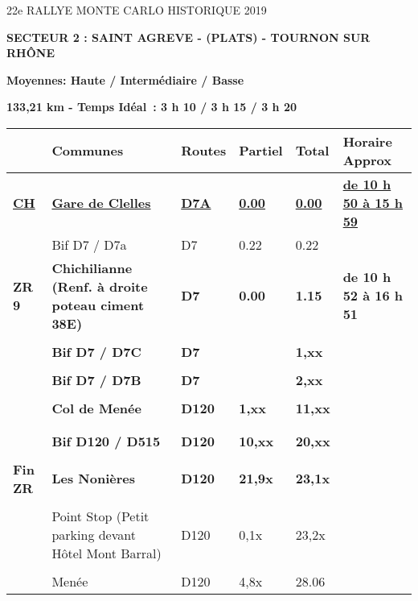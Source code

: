 \documentclass{article}%
\begin{document}
%
\normalsize%
\begin{center} \LARGE{22e RALLYE MONTE CARLO HISTORIQUE 2019} \end{center}%
\begin{flushleft} \textbf{SECTEUR 2 : SAINT AGREVE - (PLATS) - TOURNON SUR RHÔNE
} \end{flushleft}%
\begin{flushright} \textbf{             Moyennes: Haute / Intermédiaire / Basse
} \end{flushright}%
\begin{flushright} \textbf{133,21 km - Temps Idéal : 3 h 10 / 3 h 15 / 3 h 20
} \end{flushright}%
\begin{longtable}{p{2.25cm}|p{6.7cm}|p{2.0cm}|p{1.5cm}|p{1.5cm}|p{3.5cm}}%
\hline%
&Communes&Routes&Partiel&Total&Horaire Approx\\%
\hline%
\endhead%
\endfoot%
\endlastfoot%
\textbf{\underline{﻿CH}}&\textbf{\underline{Gare de Clelles}}&\textbf{\underline{D7A}}&\textbf{\underline{0.00}}&\textbf{\underline{0.00}}&\textbf{\underline{de 10 h 50 à 15 h 59}}\\%
 &Bif D7 / D7a&D7&0.22&0.22& \\%
\textbf{ ZR 9      }&\textbf{Chichilianne (Renf. à droite poteau ciment 38E)}&\textbf{D7}&\textbf{0.00}&\textbf{1.15}&\textbf{de 10 h 52 à 16 h 51}\\%
 & & & & & \\%
 &\textbf{Bif D7 / D7C}&\textbf{D7}& &\textbf{1,xx}& \\%
 & & & & & \\%
 &\textbf{Bif D7 / D7B}&\textbf{D7}& &\textbf{2,xx}& \\%
 & & & & & \\%
 &\textbf{Col de Menée }&\textbf{D120}&\textbf{1,xx}&\textbf{11,xx}& \\%
 & & & & & \\%
\hline& & & & & \\%
 &\textbf{Bif D120 / D515}&\textbf{D120}&\textbf{10,xx}&\textbf{20,xx}& \\%
 & & & & & \\%
\textbf{Fin ZR }&\textbf{Les Nonières }&\textbf{D120}&\textbf{21,9x}&\textbf{23,1x}& \\%
 & & & & & \\%
 &Point Stop (Petit parking devant Hôtel Mont Barral)&D120&0,1x&23,2x& \\%
 & & & & & \\%
 &Menée &D120&4,8x&28.06& \\%

\end{longtable}
\end{document}
